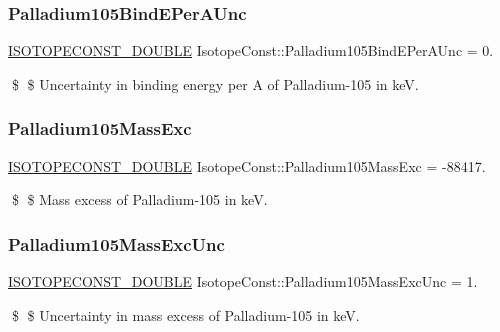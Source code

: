 \subsubsection{\texorpdfstring{Palladium105\+Bind\+E\+Per\+A\+Unc}{Palladium105BindEPerAUnc}}
{\footnotesize\ttfamily \mbox{\hyperlink{group___isotope_const-_macros_ga8f45a7272ce02c0b4c65c44636ed719a}{I\+S\+O\+T\+O\+P\+E\+C\+O\+N\+S\+T\+\_\+\+D\+O\+U\+B\+LE}} Isotope\+Const\+::\+Palladium105\+Bind\+E\+Per\+A\+Unc = 0.}

\$ \$ Uncertainty in binding energy per A of Palladium-\/105 in keV. \mbox{\label{group___isotope_const-_palladium-_pd105_ga61253d229222f035c61278571acbbe32}} 
\subsubsection{\texorpdfstring{Palladium105\+Mass\+Exc}{Palladium105MassExc}}
{\footnotesize\ttfamily \mbox{\hyperlink{group___isotope_const-_macros_ga8f45a7272ce02c0b4c65c44636ed719a}{I\+S\+O\+T\+O\+P\+E\+C\+O\+N\+S\+T\+\_\+\+D\+O\+U\+B\+LE}} Isotope\+Const\+::\+Palladium105\+Mass\+Exc = -\/88417.}

\$ \$ Mass excess of Palladium-\/105 in keV. \mbox{\label{group___isotope_const-_palladium-_pd105_ga38e16a5066170cb11d8c0674212d47d7}} 
\subsubsection{\texorpdfstring{Palladium105\+Mass\+Exc\+Unc}{Palladium105MassExcUnc}}
{\footnotesize\ttfamily \mbox{\hyperlink{group___isotope_const-_macros_ga8f45a7272ce02c0b4c65c44636ed719a}{I\+S\+O\+T\+O\+P\+E\+C\+O\+N\+S\+T\+\_\+\+D\+O\+U\+B\+LE}} Isotope\+Const\+::\+Palladium105\+Mass\+Exc\+Unc = 1.}

\$ \$ Uncertainty in mass excess of Palladium-\/105 in keV. \mbox{\label{group___isotope_const-_palladium-_pd105_gab12b949d25a51f3161e6143d706e3c89}} 
